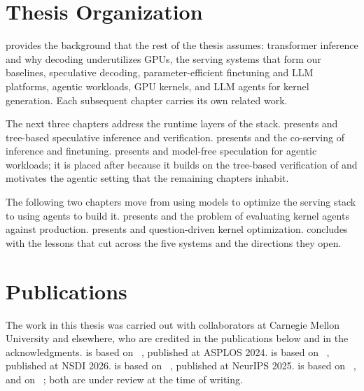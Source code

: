 \section{Thesis Organization}
\label{intro:sec:organization}

 provides the background that the rest of the thesis assumes: transformer inference and why decoding underutilizes GPUs, the serving systems that form our baselines, speculative decoding, parameter-efficient finetuning and LLM platforms, agentic workloads, GPU kernels, and LLM agents for kernel generation.
Each subsequent chapter carries its own related work.

The next three chapters address the runtime layers of the stack.
 presents \SpecInfer and tree-based speculative inference and verification.
 presents \FlexLLM and the co-serving of inference and finetuning.
 presents \SuffixDecoding and model-free speculation for agentic workloads; it is placed after \FlexLLM because it builds on the tree-based verification of  and motivates the agentic setting that the remaining chapters inhabit.

The following two chapters move from using models to optimize the serving stack to using agents to build it.
 presents \FastKernels and the problem of evaluating kernel agents against production.
 presents \KernelSeek and question-driven kernel optimization.
 concludes with the lessons that cut across the five systems and the directions they open.

\section{Publications}
\label{intro:sec:publications}

The work in this thesis was carried out with collaborators at Carnegie Mellon University and elsewhere, who are credited in the publications below and in the acknowledgments.
 is based on \SpecInfer~\cite{specinfer}, published at ASPLOS 2024.
 is based on \FlexLLM~\cite{flexllm}, published at NSDI 2026.
 is based on \SuffixDecoding~\cite{suffixdecoding}, published at NeurIPS 2025.
 is based on \FastKernels~\cite{fastkernels}, and  on \KernelSeek~\cite{kernelseek}; both are under review at the time of writing.

